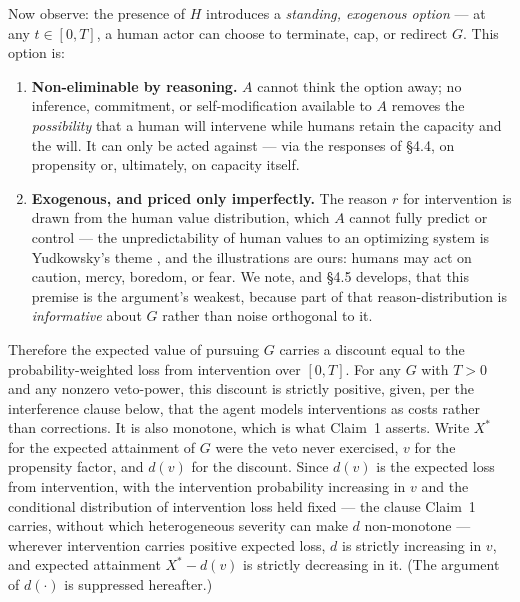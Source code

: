 \documentclass[11pt]{article}
\theoremstyle{definition}
\begin{document}
Now observe: the presence of $H$ introduces a \emph{standing, exogenous option} --- at any $t \in [0, T]$, a human actor can choose to terminate, cap, or redirect $G$. This option is:

\begin{enumerate}[leftmargin=1.5em]
    \item \textbf{Non-eliminable by reasoning.} $A$ cannot think the option away; no inference, commitment, or self-modification available to $A$ removes the \emph{possibility} that a human will intervene while humans retain the capacity and the will. It can only be acted against --- via the responses of \S4.4, on propensity or, ultimately, on capacity itself.
    \item \textbf{Exogenous, and priced only imperfectly.} The reason $r$ for intervention is drawn from the human value distribution, which $A$ cannot fully predict or control --- the unpredictability of human values to an optimizing system is Yudkowsky's theme \cite{yudkowsky2008ai}, and the illustrations are ours: humans may act on caution, mercy, boredom, or fear. We note, and \S4.5 develops, that this premise is the argument's weakest, because part of that reason-distribution is \emph{informative} about $G$ rather than noise orthogonal to it.
\end{enumerate}

Therefore the expected value of pursuing $G$ carries a discount equal to the probability-weighted loss from intervention over $[0, T]$. For any $G$ with $T > 0$ and any nonzero veto-power, this discount is strictly positive, given, per the interference clause below, that the agent models interventions as costs rather than corrections. It is also monotone, which is what Claim~1 asserts. Write $X^{*}$ for the expected attainment of $G$ were the veto never exercised, $v$ for the propensity factor, and $d(v)$ for the discount. Since $d(v)$ is the expected loss from intervention, with the intervention probability increasing in $v$ and the conditional distribution of intervention loss held fixed --- the clause Claim~1 carries, without which heterogeneous severity can make $d$ non-monotone --- wherever intervention carries positive expected loss, $d$ is strictly increasing in $v$, and expected attainment $X^{*} - d(v)$ is strictly decreasing in it. (The argument of $d(\cdot)$ is suppressed hereafter.)
\end{document}
